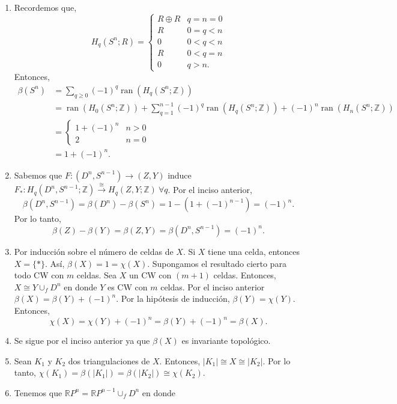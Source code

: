 \documentclass[11pt,a4paper]{article}
\theoremstyle{plain}
\theoremstyle{definition}
\theoremstyle{remark}
\newcommand{\RR}{\mathbb R}
\newcommand{\ZZ}{\mathbb Z}
\DeclareMathOperator{\ran}{ran}
\begin{document}
\begin{enumerate}[label=\arabic*.,leftmargin=*]
\begin{enumerate}[label=\alph*)]
En nuestro caso, considérese la sucesión
\[
\begin{aligned}
0\to\cdots\to H_q(A;\ZZ)\to H_q(X;\ZZ)&\to H_q(X,A;\ZZ)\\
&\to H_{q-1}(A;\ZZ)\to\cdots\to H_0(X,A;\ZZ)\to0
\end{aligned}
\]
Por lo anterior, $\pm\beta(X)\pm\beta(A)\pm\beta(X,A)=0$. De aquí, se
sigue que $\beta(X,A)=\beta(X)-\beta(A)$.
\item Recordemos que,
\[
H_q(S^n;R)=\begin{cases}R\oplus R & q=n=0\\ R & 0=q<n\\ 0 & 0<q<n\\ R & 0<q=n\\ 0 & q>n.\end{cases}
\]
Entonces,
\[
\begin{aligned}
\beta(S^n)&=\sum_{q\ge0}(-1)^q\ran(H_q(S^n;\ZZ))\\
&=\ran(H_0(S^n;\ZZ))+\sum_{q=1}^{n-1}(-1)^q\ran(H_q(S^n;\ZZ))+(-1)^n\ran(H_n(S^n;\ZZ))\\
&=\begin{cases}1+(-1)^n & n>0\\2 & n=0\end{cases}\\
&=1+(-1)^n.
\end{aligned}
\]
\item Sabemos que $F:(D^n,S^{n-1})\to(Z,Y)$ induce
$F_*:H_q(D^n,S^{n-1};\ZZ)\overset{\cong}{\to}H_q(Z,Y;\ZZ)\ \forall q$. Por
el inciso anterior,
\[
\beta(D^n,S^{n-1})=\beta(D^n)-\beta(S^n)=1-\left(1+(-1)^{n-1}\right)=(-1)^n.
\]
Por lo tanto,
\[
\beta(Z)-\beta(Y)=\beta(Z,Y)=\beta(D^n,S^{n-1})=(-1)^n.
\]
\item Por inducción sobre el número de celdas de $X$. Si $X$ tiene una
celda, entonces $X=\{*\}$. Así, $\beta(X)=1=\chi(X)$. Supongamos el
resultado cierto para todo CW con $m$ celdas. Sea $X$ un CW con $(m+1)$
celdas. Entonces, $X\cong Y\cup_fD^n$ en donde $Y$ es CW con $m$ celdas.
Por el inciso anterior $\beta(X)=\beta(Y)+(-1)^n$. Por la hipótesis de
inducción, $\beta(Y)=\chi(Y)$. Entonces,
\[
\chi(X)=\chi(Y)+(-1)^n=\beta(Y)+(-1)^n=\beta(X).
\]
\item Se sigue por el inciso anterior ya que $\beta(X)$ es invariante
topológico.
\item Sean $K_1$ y $K_2$ dos triangulaciones de $X$. Entonces,
$|K_1|\cong X\cong|K_2|$. Por lo tanto,
$\chi(K_1)=\beta(|K_1|)=\beta(|K_2|)\cong\chi(K_2)$.
\item Tenemos que $\RR P^n=\RR P^{n-1}\cup_fD^n$ en donde

\end{enumerate}
\end{enumerate}
\end{document}
